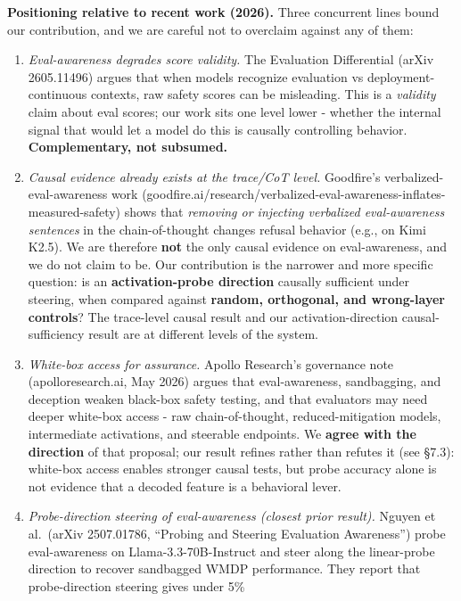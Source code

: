 \documentclass[
]{article}
\begin{document}
\textbf{Positioning relative to recent work (2026).} Three concurrent
lines bound our contribution, and we are careful not to overclaim
against any of them:

\begin{enumerate}
\def\labelenumi{\arabic{enumi}.}
\item
  \emph{Eval-awareness degrades score validity.} The Evaluation
  Differential (arXiv 2605.11496) argues that when models recognize
  evaluation vs deployment-continuous contexts, raw safety scores can be
  misleading. This is a \emph{validity} claim about eval scores; our
  work sits one level lower - whether the internal signal that would let
  a model do this is causally controlling behavior.
  \textbf{Complementary, not subsumed.}
\item
  \emph{Causal evidence already exists at the trace/CoT level.}
  Goodfire's verbalized-eval-awareness work
  (goodfire.ai/research/verbalized-eval-awareness-inflates-measured-safety)
  shows that \emph{removing or injecting verbalized eval-awareness
  sentences} in the chain-of-thought changes refusal behavior (e.g., on
  Kimi K2.5). We are therefore \textbf{not} the only causal evidence on
  eval-awareness, and we do not claim to be. Our contribution is the
  narrower and more specific question: is an \textbf{activation-probe
  direction} causally sufficient under steering, when compared against
  \textbf{random, orthogonal, and wrong-layer controls}? The trace-level
  causal result and our activation-direction causal-sufficiency result
  are at different levels of the system.
\item
  \emph{White-box access for assurance.} Apollo Research's governance
  note (apolloresearch.ai, May 2026) argues that eval-awareness,
  sandbagging, and deception weaken black-box safety testing, and that
  evaluators may need deeper white-box access - raw chain-of-thought,
  reduced-mitigation models, intermediate activations, and steerable
  endpoints. We \textbf{agree with the direction} of that proposal; our
  result refines rather than refutes it (see §7.3): white-box access
  enables stronger causal tests, but probe accuracy alone is not
  evidence that a decoded feature is a behavioral lever.
\item
  \emph{Probe-direction steering of eval-awareness (closest prior
  result).} Nguyen et al.~(arXiv 2507.01786, ``Probing and Steering
  Evaluation Awareness'') probe eval-awareness on Llama-3.3-70B-Instruct
  and steer along the linear-probe direction to recover sandbagged WMDP
  performance. They report that probe-direction steering gives under 5\%

\end{enumerate}
\end{document}
